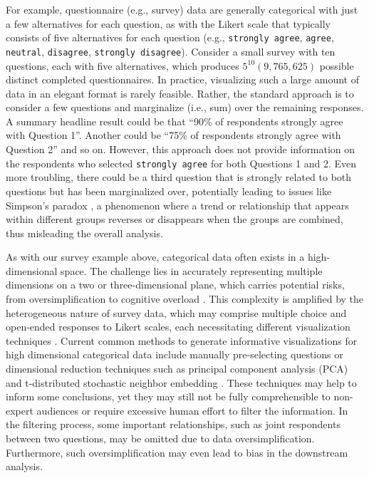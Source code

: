 For example, questionnaire (e.g., survey) data are generally categorical with just a few alternatives for each question, as with the Likert scale that typically consists of five alternatives for each question (e.g., \texttt{strongly agree}, \texttt{agree}, \texttt{neutral}, \texttt{disagree}, \texttt{strongly disagree}). Consider a small survey with ten questions, each with five alternatives, which produces $5^{10} (9,765,625)$ possible distinct completed questionnaires. In practice, visualizing such a large amount of data in an elegant format is rarely feasible. Rather, the standard approach is to consider a few questions and marginalize (i.e., sum) over the remaining responses. A summary headline result could be that ``90\% of respondents strongly agree with Question 1''. Another could be ``75\% of respondents strongly agree with Question 2'' and so on. However, this approach does not provide information on the respondents who selected \texttt{strongly agree} for both Questions 1 and 2. Even more troubling, there could be a third question that is strongly related to both questions but has been marginalized over, potentially leading to issues like Simpson's paradox \citep{hernan2011simpsons}, a phenomenon where a trend or relationship that appears within different groups reverses or disappears when the groups are combined, thus misleading the overall analysis.

As with our survey example above, categorical data often exists in a high-dimensional space. The challenge lies in accurately representing multiple dimensions on a two or three-dimensional plane, which carries potential risks, from oversimplification to cognitive overload \citep{fayyad2002information}. This complexity is amplified by the heterogeneous nature of survey data, which may comprise multiple choice and open-ended responses to Likert scales, each necessitating different visualization techniques \citep{shneiderman1996eyes}. Current common methods to generate informative visualizations for high dimensional categorical data include manually pre-selecting questions or dimensional reduction techniques such as principal component analysis (PCA) and t-distributed stochastic neighbor embedding \citep{Wong1997MultivariateVU}. These techniques may help to inform some conclusions, yet they may still not be fully comprehensible to non-expert audiences or require excessive human effort to filter the information. In the filtering process, some important relationships, such as joint respondents between two questions, may be omitted due to data oversimplification. Furthermore, such oversimplification may even lead to bias in the downstream analysis.

